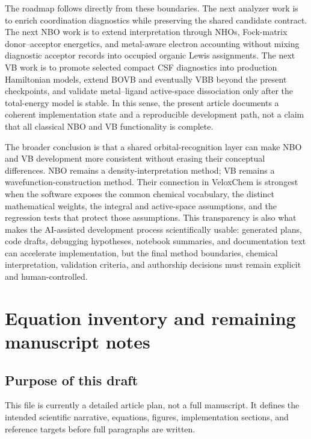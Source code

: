 \documentclass[11pt]{article}
\begin{document}
The roadmap follows directly from these boundaries.  The next analyzer work is to enrich coordination diagnostics while preserving the shared candidate contract.  The next NBO work is to extend interpretation through NHOs, Fock-matrix donor--acceptor energetics, and metal-aware electron accounting without mixing diagnostic acceptor records into occupied organic Lewis assignments.  The next VB work is to promote selected compact CSF diagnostics into production Hamiltonian models, extend BOVB and eventually VBB beyond the present checkpoints, and validate metal--ligand active-space dissociation only after the total-energy model is stable.  In this sense, the present article documents a coherent implementation state and a reproducible development path, not a claim that all classical NBO and VB functionality is complete.

The broader conclusion is that a shared orbital-recognition layer can make NBO and VB development more consistent without erasing their conceptual differences.  NBO remains a density-interpretation method; VB remains a wavefunction-construction method.  Their connection in VeloxChem is strongest when the software exposes the common chemical vocabulary, the distinct mathematical weights, the integral and active-space assumptions, and the regression tests that protect those assumptions.  This transparency is also what makes the AI-assisted development process scientifically usable: generated plans, code drafts, debugging hypotheses, notebook summaries, and documentation text can accelerate implementation, but the final method boundaries, chemical interpretation, validation criteria, and authorship decisions must remain explicit and human-controlled.

\appendix
\section{Equation inventory and remaining manuscript notes}

\subsection{Purpose of this draft}
This file is currently a detailed article plan, not a full manuscript.  It defines the intended scientific narrative, equations, figures, implementation sections, and reference targets before full paragraphs are written.
\end{document}
